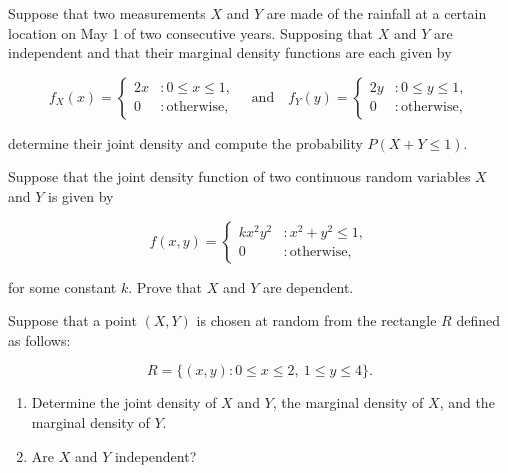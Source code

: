 \documentclass[12pt,reqno]{amsart}
\begin{document}
\newpage
\prob Suppose that two measurements $X$ and $Y$ are made of the rainfall at a certain location on May 1 of two consecutive years. Supposing that $X$ and $Y$ are independent and that their marginal density functions are each given by

	\[
	f_X(x) = \begin{cases}
	2x & : 0 \leq x \leq 1, \\
	0 & : \text{otherwise},
	\end{cases} \quad \text{and} \quad
	f_Y(y) = \begin{cases}
	2y & : 0 \leq y \leq 1, \\
	0 & : \text{otherwise},
	\end{cases}
	\]

determine their joint density and compute the probability $P(X + Y \leq 1)$.\vfill


	
	
	
	
	
	















\bigskip
\prob Suppose that the joint density function of two continuous random variables $X$ and $Y$ is given by

	\[
	f(x,y) = \begin{cases}
	k x^2y^2 & : x^2+y^2 \leq 1, \\
	0 & : \text{otherwise},
	\end{cases}
	\]
	
for some constant $k$. Prove that $X$ and $Y$ are dependent.\vfill














\bigskip
\prob Suppose that a point $(X, Y )$ is chosen at random from the rectangle $R$ defined as follows:

	\[
	R=\{(x,y) : 0\leq x \leq 2, \ 1\leq y\leq 4\}.
	\]

\medskip
\begin{enumerate}
\item Determine the joint density of $X$ and $Y$, the marginal density of $X$, and the marginal density of $Y$.\vfill
\item Are $X$ and $Y$ independent?\vfill
\end{enumerate}
\end{document}
